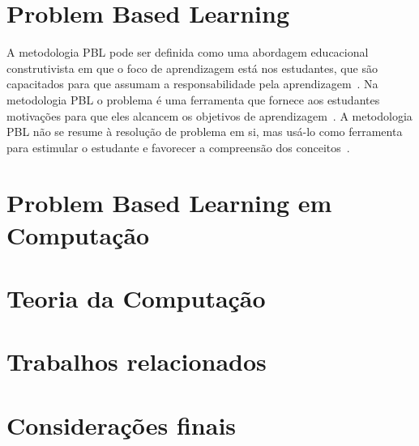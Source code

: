 \acresetall
\section{Problem Based Learning}
A metodologia PBL pode ser definida como uma abordagem educacional
construtivista em que o foco de aprendizagem está nos estudantes,
que são capacitados para que assumam a responsabilidade pela
aprendizagem~\cite{dolmans2005problem}.
Na metodologia PBL o problema é uma ferramenta que fornece
aos estudantes motivações para que eles alcancem os
objetivos de aprendizagem~\cite{wood2003problem, o2012practical}.
A metodologia PBL não se resume à resolução de problema em si, mas usá-lo como
ferramenta para estimular o estudante e favorecer a compreensão dos
conceitos~\cite{wood2003problem}.
\section{Problem Based Learning em Computação}
\section{Teoria da Computação}
\section{Trabalhos relacionados}
\section{Considerações finais}
